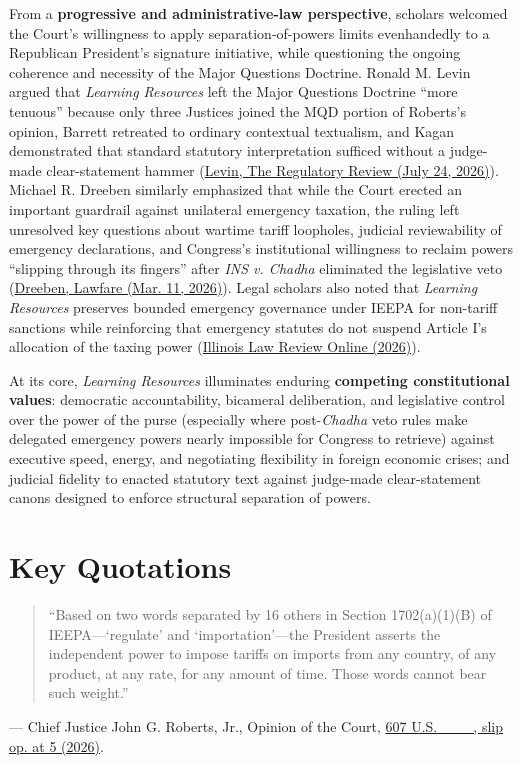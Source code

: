 \documentclass[12pt]{article}
\begin{document}
From a \textbf{progressive and administrative-law perspective}, scholars welcomed the Court's willingness to apply separation-of-powers limits evenhandedly to a Republican President's signature initiative, while questioning the ongoing coherence and necessity of the Major Questions Doctrine. Ronald M. Levin argued that \textit{Learning Resources} left the Major Questions Doctrine ``more tenuous'' because only three Justices joined the MQD portion of Roberts's opinion, Barrett retreated to ordinary contextual textualism, and Kagan demonstrated that standard statutory interpretation sufficed without a judge-made clear-statement hammer (\href{https://www.theregreview.org/2026/07/24/levin-the-tariff-case-and-the-major-questions-doctrine/}{Levin, The Regulatory Review (July 24, 2026)}). Michael R. Dreeben similarly emphasized that while the Court erected an important guardrail against unilateral emergency taxation, the ruling left unresolved key questions about wartime tariff loopholes, judicial reviewability of emergency declarations, and Congress's institutional willingness to reclaim powers ``slipping through its fingers'' after \textit{INS v. Chadha} eliminated the legislative veto (\href{https://www.lawfaremedia.org/article/constitutional-duels-in-the-court-s-rejection-of-trump-s-tariffs}{Dreeben, Lawfare (Mar. 11, 2026)}). Legal scholars also noted that \textit{Learning Resources} preserves bounded emergency governance under IEEPA for non-tariff sanctions while reinforcing that emergency statutes do not suspend Article I's allocation of the taxing power (\href{https://illinoislawreview.org/online/emergency-economic-powers-and-the-non-tariff-limits-of-ieepa/}{Illinois Law Review Online (2026)}).

At its core, \textit{Learning Resources} illuminates enduring \textbf{competing constitutional values}: democratic accountability, bicameral deliberation, and legislative control over the power of the purse (especially where post-\textit{Chadha} veto rules make delegated emergency powers nearly impossible for Congress to retrieve) against executive speed, energy, and negotiating flexibility in foreign economic crises; and judicial fidelity to enacted statutory text against judge-made clear-statement canons designed to enforce structural separation of powers.

\section{Key Quotations}
\begin{quote}
``Based on two words separated by 16 others in Section 1702(a)(1)(B) of IEEPA---`regulate' and `importation'---the President asserts the independent power to impose tariffs on imports from any country, of any product, at any rate, for any amount of time. Those words cannot bear such weight.''
\end{quote}
\noindent --- Chief Justice John G. Roberts, Jr., Opinion of the Court, \href{https://www.law.cornell.edu/supremecourt/text/24-1287}{607 U.S. \_\_\_, slip op. at 5 (2026)}.
\end{document}
